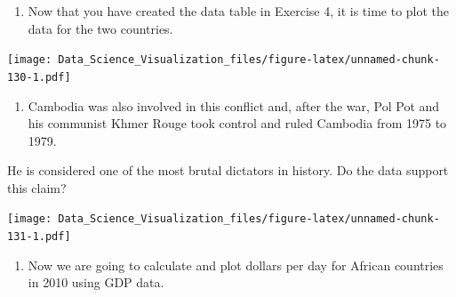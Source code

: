 \documentclass[
]{article}
\newenvironment{Shaded}{\begin{snugshade}}{\end{snugshade}}
\newcommand{\DataTypeTok}[1]{\textcolor[rgb]{0.13,0.29,0.53}{#1}}
\newcommand{\DecValTok}[1]{\textcolor[rgb]{0.00,0.00,0.81}{#1}}
\newcommand{\KeywordTok}[1]{\textcolor[rgb]{0.13,0.29,0.53}{\textbf{#1}}}
\newcommand{\NormalTok}[1]{#1}
\newcommand{\OperatorTok}[1]{\textcolor[rgb]{0.81,0.36,0.00}{\textbf{#1}}}
\newcommand{\StringTok}[1]{\textcolor[rgb]{0.31,0.60,0.02}{#1}}
\providecommand{\tightlist}{%
  \setlength{\itemsep}{0pt}\setlength{\parskip}{0pt}}
\begin{document}
\begin{enumerate}
\def\labelenumi{\arabic{enumi}.}
\setcounter{enumi}{4}
\tightlist
\item
  Now that you have created the data table in Exercise 4, it is time to
  plot the data for the two countries.
\end{enumerate}

\begin{Shaded}
\end{Shaded}

\texttt{[image: Data\_Science\_Visualization\_files/figure-latex/unnamed-chunk-130-1.pdf]}

\begin{enumerate}
\def\labelenumi{\arabic{enumi}.}
\setcounter{enumi}{5}
\tightlist
\item
  Cambodia was also involved in this conflict and, after the war, Pol
  Pot and his communist Khmer Rouge took control and ruled Cambodia from
  1975 to 1979.
\end{enumerate}

He is considered one of the most brutal dictators in history. Do the
data support this claim?

\begin{Shaded}
\end{Shaded}

\texttt{[image: Data\_Science\_Visualization\_files/figure-latex/unnamed-chunk-131-1.pdf]}

\begin{enumerate}
\def\labelenumi{\arabic{enumi}.}
\setcounter{enumi}{6}
\tightlist
\item
  Now we are going to calculate and plot dollars per day for African
  countries in 2010 using GDP data.
\end{enumerate}
\end{document}
